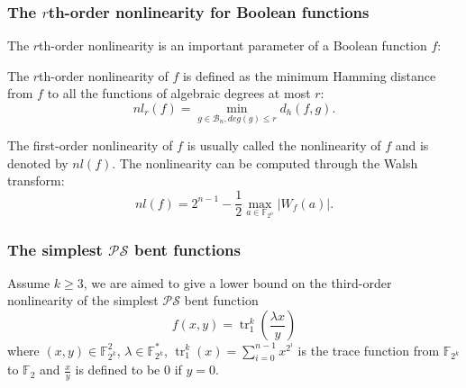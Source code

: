 \documentclass[
    aspectratio=169,                   %
]{beamer}
\newcommand{\F}{\mathbb{F}}
\newcommand{\Fn}{\mathbb{F}_{2^n}}
\newcommand{\Fks}{\mathbb{F}_{2^k}^*}
\newcommand{\Fk}{\mathbb{F}_{2^k}}
\newcommand{\tr}{\operatorname{tr}_1^k}
\newcommand{\Bn}{\mathcal{B}_n}
\begin{document}
    \begin{frame}
        \frametitle{The $ r $th-order nonlinearity for Boolean functions}
    
        The $ r $th-order nonlinearity is an important parameter of a Boolean function $ f $:
        \begin{definition}
            The $ r $th-order nonlinearity of $ f $ is 
            defined as the minimum Hamming distance from $ f $ to all the functions of algebraic degrees at most $ r $:
            \[nl_r(f)=\min_{g\in\Bn,deg(g)\le r}d_h(f,g).\]  
        \end{definition} 
        
        \begin{remark}
            The first-order nonlinearity of $ f $ is usually called the nonlinearity of $ f $ and is denoted by $ nl(f) $. 
            The nonlinearity can be computed through the Walsh transform: 
            \[nl(f)=2^{n-1}-\frac{1}{2}\max_{a\in\Fn}\left\lvert W_f(a)\right\rvert.\]
        \end{remark}
    \end{frame}


    \begin{frame}
        \frametitle{The simplest $ \mathcal{PS} $ bent functions}

        Assume $ k\ge 3 $, we are aimed to give a lower bound 
        on the third-order nonlinearity of the simplest $ \mathcal{PS} $ bent function
        \begin{equation}
            f(x,y)=\tr\left(\frac{\lambda x}{y}\right)
        \end{equation}
        where $ (x,y)\in\F_{2^k}^2 $, $ \lambda\in\Fks $,  
        $ \tr(x)=\sum_{i=0}^{n-1}x^{2^i} $ is the trace function from $ \Fk $ to $ \F_2 $ and $ \frac{x}{y} $ is defined 
        to be $ 0 $ if $ y =0 $. 
    \end{frame}
        
\end{document}
